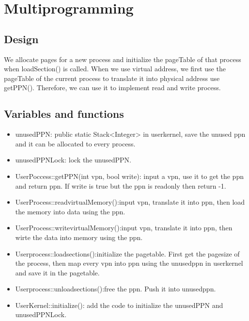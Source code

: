 \documentclass[a4paper,10pt]{article}
\begin{document}
\section{Multiprogramming}

\subsection{Design}

We allocate pages for a new process and initialize the pageTable of that process when loadSection() is called. When we use virtual address, we first use the pageTable of the current process to translate it into physical address use getPPN(). Therefore, we can use it to implement read and write process.

\subsection{Variables and functions}

\begin{itemize}
\item unusedPPN: public static Stack<Integer> in userkernel, save the unused ppn and it can be allocated to every process.

\item unusedPPNLock: lock the unusedPPN.

\item UserPoccess::getPPN(int vpn, bool write): input a vpn, use it to get the ppn and return ppn. If write is true but the ppn is readonly then return -1.

\item UserProcess::readvirtualMemory():input vpn, translate it into ppn, then load the memory into data using the ppn.

\item UserProcess::writevirtualMemory():input vpn, translate it into ppn, then wirte the data into memory using the ppn.

\item Userprocess::loadsections():initialize the pagetable. First get the pagesize of the process, then map every vpn into ppn using the unusedppn in userkernel and save it in the pagetable.

\item Userprocess::unloadsections():free the ppn. Push it into unusedppn.

\item UserKernel::initialize(): add the code to initialize the unusedPPN and unusedPPNLock.
\end{itemize}
\end{document}
